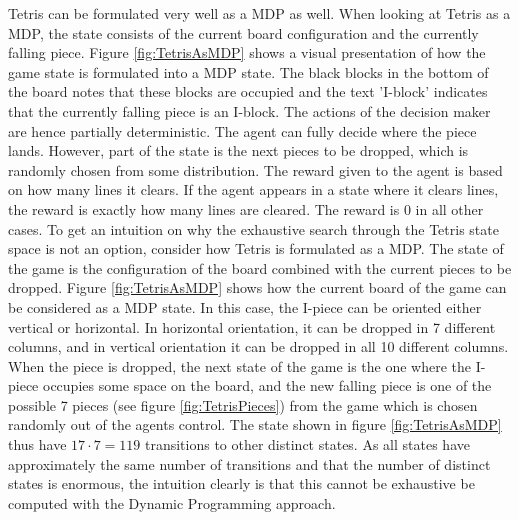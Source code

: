 Tetris can be formulated very well as a MDP as well.
When looking at Tetris as a MDP, the state consists
of the current board configuration and the currently falling piece.
Figure \ref{fig:TetrisAsMDP} shows a visual presentation 
of how the game state is formulated into a MDP state. The black
blocks in the bottom of the board notes that these blocks are 
occupied and the text 'I-block' indicates that the currently
falling piece is an I-block.
The actions of the decision maker are hence partially deterministic.
The agent can fully decide where the piece lands. However,
part of the state is the next pieces to be dropped, which is
randomly chosen from some distribution. The reward given to the agent
is based on how many lines it clears. If the agent appears in a state 
where it clears lines, the reward is exactly how many lines are cleared.
The reward is 0 in all other cases.
To get an intuition on why the exhaustive search through the Tetris 
state space is not an option, consider how Tetris is formulated as a MDP.
The state of the game is the configuration of the board combined with 
the current pieces to be dropped. Figure \ref{fig:TetrisAsMDP} shows
how the current board of the game can be considered as a MDP state. 
In this case, the I-piece can be oriented either vertical or horizontal. 
In horizontal orientation, it can be dropped in 7 different columns,
and in vertical orientation it can be dropped in all 10 different columns.
When the piece is dropped, the next state of the game is the one 
where the I-piece occupies some space on the board, and the new falling piece
is one of the possible 7 pieces (see figure \ref{fig:TetrisPieces}) 
from the game which is chosen randomly 
out of the agents control. The state shown in figure \ref{fig:TetrisAsMDP}
thus have $17 \cdot 7 = 119$ transitions to other distinct states.
As all states have approximately the same number of transitions
and that the number of distinct states is enormous, the intuition 
clearly is that this cannot be exhaustive be computed with the Dynamic 
Programming approach.
